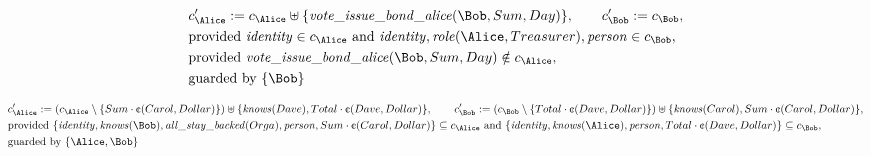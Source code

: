 \begin{align*}
&
c'_
{
\Alice
}
 := 
c_
{
\Alice
}
 \uplus 
\{
\mathit{\detokenize{
vote_issue_bond_alice
}}
(
\Bob
,
Sum
,
Day
)
\}
, \qquad 
c'_
{
\Bob
}
 := 
c_
{
\Bob
}
,\\
&
\text{provided } 
\mathit{\detokenize{
identity
}}
 \in c_
{
\Alice
}
 \text{ and } 
\mathit{\detokenize{
identity
}}
,
\mathit{\detokenize{
role
}}
(
\Alice
,
Treasurer
)
,
\mathit{\detokenize{
person
}}
 \in c_
{
\Bob
}
,\\
&
\text{provided } 
\mathit{\detokenize{
vote_issue_bond_alice
}}
(
\Bob
,
Sum
,
Day
)
 \notin c_
{
\Alice
}
,\\
&
\text{guarded by } \{
\Bob
\}
\end{align*}

\begin{align*}
&
c'_
{
\Alice
}
 := 
(c_
{
\Alice
}
 \setminus 
\{
Sum
\cdot
\text{\textcent}
(
Carol
,
Dollar
)
\}
) \uplus 
\{
\mathit{\detokenize{
knows
}}
(
Dave
)
,
Total
\cdot
\text{\textcent}
(
Dave
,
Dollar
)
\}
, \qquad 
c'_
{
\Bob
}
 := 
(c_
{
\Bob
}
 \setminus 
\{
Total
\cdot
\text{\textcent}
(
Dave
,
Dollar
)
\}
) \uplus 
\{
\mathit{\detokenize{
knows
}}
(
Carol
)
,
Sum
\cdot
\text{\textcent}
(
Carol
,
Dollar
)
\}
,\\
&
\text{provided } 
\{
\mathit{\detokenize{
identity
}}
,
\mathit{\detokenize{
knows
}}
(
\Bob
)
,
\mathit{\detokenize{
all_stay_backed
}}
(
Orga
)
,
\mathit{\detokenize{
person
}}
,
Sum
\cdot
\text{\textcent}
(
Carol
,
Dollar
)
\}
 \subseteq c_
{
\Alice
}
 \text{ and } 
\{
\mathit{\detokenize{
identity
}}
,
\mathit{\detokenize{
knows
}}
(
\Alice
)
,
\mathit{\detokenize{
person
}}
,
Total
\cdot
\text{\textcent}
(
Dave
,
Dollar
)
\}
 \subseteq c_
{
\Bob
}
,\\
&
\text{guarded by } \{
\Alice
,
\Bob
\}
\end{align*}

